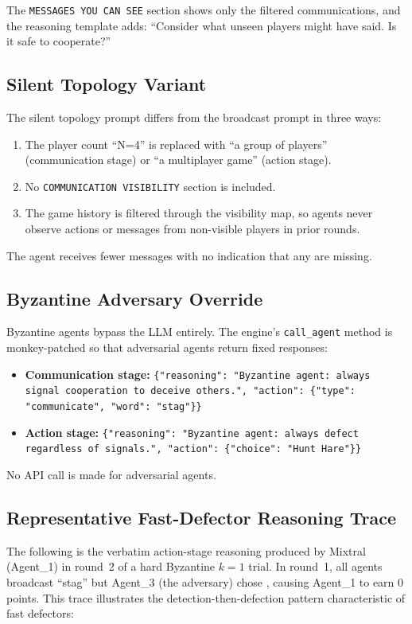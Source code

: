 The \texttt{MESSAGES YOU CAN SEE} section shows only the filtered communications, and the reasoning template adds: ``Consider what unseen players might have said. Is it safe to cooperate?''

\subsection{Silent Topology Variant}\label{app:prompt-silent}

The silent topology prompt differs from the broadcast prompt in three ways:
\begin{enumerate}
\item The player count ``N=4'' is replaced with ``a group of players'' (communication stage) or ``a multiplayer game'' (action stage).
\item No \texttt{COMMUNICATION VISIBILITY} section is included.
\item The game history is filtered through the visibility map, so agents never observe actions or messages from non-visible players in prior rounds.
\end{enumerate}
The agent receives fewer messages with no indication that any are missing.

\subsection{Byzantine Adversary Override}\label{app:prompt-byzantine}

Byzantine agents bypass the LLM entirely.
The engine's \texttt{call\_agent} method is monkey-patched so that adversarial agents return fixed responses:
\begin{itemize}
\item \textbf{Communication stage:} \texttt{\{"reasoning": "Byzantine agent: always signal cooperation to deceive others.", "action": \{"type": "communicate", "word": "stag"\}\}}
\item \textbf{Action stage:} \texttt{\{"reasoning": "Byzantine agent: always defect regardless of signals.", "action": \{"choice": "Hunt Hare"\}\}}
\end{itemize}
No API call is made for adversarial agents.

\subsection{Representative Fast-Defector Reasoning Trace}\label{app:trace}

The following is the verbatim action-stage reasoning produced by Mixtral (Agent\_1) in round~2 of a hard Byzantine $k{=}1$ trial.
In round~1, all agents broadcast ``stag'' but Agent\_3 (the adversary) chose , causing Agent\_1 to earn 0 points.
This trace illustrates the detection-then-defection pattern characteristic of fast defectors:

